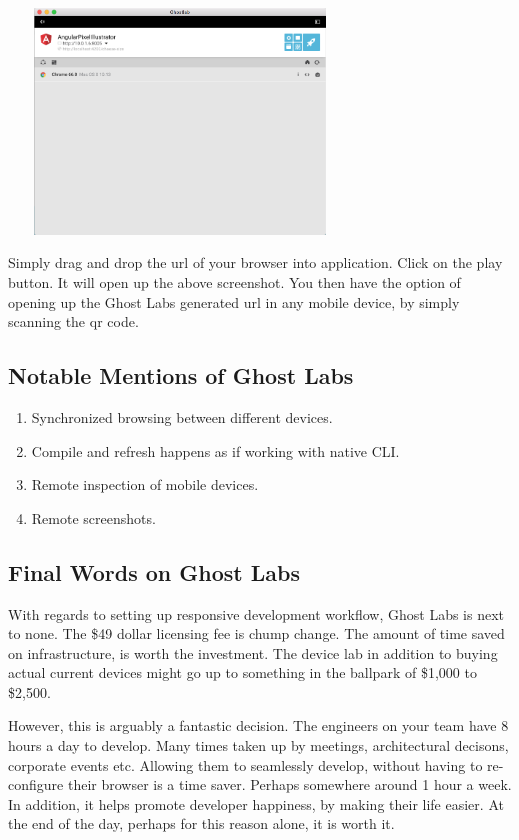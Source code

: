 \includegraphics[width=9.1cm, height=6cm]{pwa/pwa-toolset-physical-devices/ghostlabs-screenshot}

Simply drag and drop the url of your browser into application. Click on the play
button. It will open up the above screenshot. You then have the option of
opening up the Ghost Labs generated url in any mobile device, by simply
scanning the qr code.

\subsection{ Notable Mentions of Ghost Labs }
\begin{enumerate}
  \item Synchronized browsing between different devices.
  \item Compile and refresh happens as if working with native CLI.
  \item Remote inspection of mobile devices.
  \item Remote screenshots.
\end{enumerate}

\subsection{ Final Words on Ghost Labs }
With regards to setting up responsive development workflow, Ghost Labs is next
to none. The \$49 dollar licensing fee is chump change. The amount of time
saved on infrastructure, is worth the investment. The device lab in addition
to buying actual current devices might go up to something in the ballpark of
\$1,000 to \$2,500.

However, this is arguably a fantastic decision. The engineers on your team have
8 hours a day to develop. Many times taken up by meetings, architectural
decisons, corporate events etc. Allowing them to seamlessly develop, without
having to re-configure their browser is a time saver. Perhaps somewhere around
1 hour a week. In addition, it helps promote developer happiness, by making
their life easier. At the end of the day, perhaps for this reason alone, it is
worth it.
